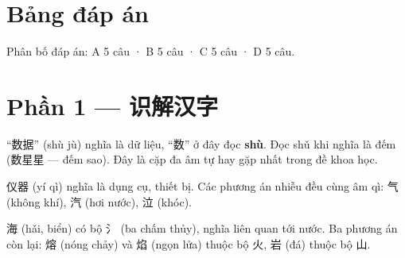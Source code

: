 \documentclass[11pt, a4paper]{article}
\begin{document}

\section*{Bảng đáp án}


\vspace{0.2cm}
\noindent Phân bố đáp án: A 5 câu · B 5 câu · C 5 câu · D 5 câu.

\section*{Phần 1 — 识解汉字}

\begin{dapan}[1 — Đáp án C]
“数据” (shù jù) nghĩa là dữ liệu, “数” ở đây đọc \textbf{shù}. Đọc shǔ khi nghĩa là đếm (数星星 — đếm sao). Đây là cặp đa âm tự hay gặp nhất trong đề khoa học.
\end{dapan}

\begin{dapan}[2 — Đáp án B]
仪器 (yí qì) nghĩa là dụng cụ, thiết bị. Các phương án nhiễu đều cùng âm qì: 气 (không khí), 汽 (hơi nước), 泣 (khóc).
\end{dapan}

\begin{dapan}[3 — Đáp án D]
海 (hǎi, biển) có bộ 氵 (ba chấm thủy), nghĩa liên quan tới nước. Ba phương án còn lại: 熔 (nóng chảy) và 焰 (ngọn lửa) thuộc bộ 火, 岩 (đá) thuộc bộ 山.
\end{dapan}

\end{document}
